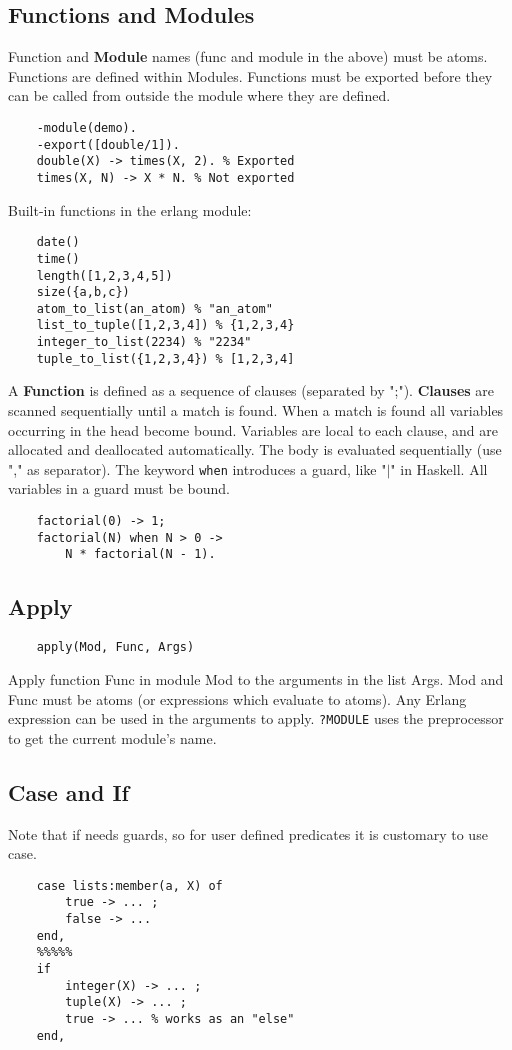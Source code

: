 \subsection{Functions and Modules}
Function and \textbf{Module} names (func and module in the above) must be atoms.
Functions are defined within Modules.
Functions must be exported before they can be called from outside the module where they are defined.
\begin{lstlisting}
	-module(demo).
	-export([double/1]).
	double(X) -> times(X, 2). % Exported
	times(X, N) -> X * N. % Not exported
\end{lstlisting}
Built-in functions in the erlang module:
\begin{lstlisting}
	date()
	time()
	length([1,2,3,4,5])
	size({a,b,c})
	atom_to_list(an_atom) % "an_atom"
	list_to_tuple([1,2,3,4]) % {1,2,3,4}
	integer_to_list(2234) % "2234"
	tuple_to_list({1,2,3,4}) % [1,2,3,4]
\end{lstlisting}
A \textbf{Function} is defined as a sequence of clauses (separated by ";").
\textbf{Clauses} are scanned sequentially until a match is found.
When a match is found all variables occurring in the head become bound.
Variables are local to each clause, and are allocated and deallocated automatically.
The body is evaluated sequentially (use "," as separator).
The keyword \texttt{when} introduces a guard, like "$\mid$" in Haskell.
All variables in a guard must be bound.
\begin{lstlisting}
	factorial(0) -> 1;
	factorial(N) when N > 0 ->
		N * factorial(N - 1).
\end{lstlisting}

\subsection{Apply}
\begin{lstlisting}
	apply(Mod, Func, Args)
\end{lstlisting}
Apply function Func in module Mod to the arguments in the list Args.
Mod and Func must be atoms (or expressions which evaluate to atoms).
Any Erlang expression can be used in the arguments to apply.
\texttt{?MODULE} uses the preprocessor to get the current module’s name.

\subsection{Case and If}
Note that if needs guards, so for user defined predicates it is customary to use case.
\begin{lstlisting}
	case lists:member(a, X) of
		true -> ... ;
		false -> ...
	end,
	%%%%%
	if
		integer(X) -> ... ;
		tuple(X) -> ... ;
		true -> ... % works as an "else"
	end,
\end{lstlisting}


